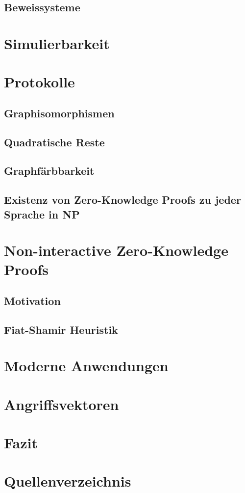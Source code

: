 \documentclass {article}
\begin{document}
\subsection{Beweissysteme}
\section{Simulierbarkeit}
\section{Protokolle}
\subsection{Graphisomorphismen}
\subsection{Quadratische Reste}
\subsection{Graphfärbbarkeit}
\subsection{Existenz von Zero-Knowledge Proofs zu jeder Sprache in NP }
\section{Non-interactive Zero-Knowledge Proofs}
\subsection{Motivation}
\subsection{Fiat-Shamir Heuristik}
\section{Moderne Anwendungen}
\section{Angriffsvektoren}
\section{Fazit}

\newpage
\section{Quellenverzeichnis}

\nocite{BG89}
\nocite{BM89}
\nocite{GMR85}
\nocite{GO94}
\nocite{KZKP}
\nocite{PrSa14}
\nocite{RS91}

\printbibliography


  
\end{document}
